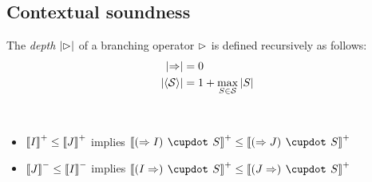 \subsection{Contextual soundness}

\begin{definition}
  The \emph{depth} $\left|\mathbin{\rhd}\right|$ of a branching operator $\mathbin{\rhd}$ is defined
  recursively as follows:
  \begin{align*}
    \left|\Rightarrow\right| &= 0 \\
    \left|\mathbin{\langle \mathcal{S} \rangle}\right| &= 1 + \max_{S \in \mathcal{S}}{\left|S\right|}
  \end{align*}
\end{definition}

\begin{lemma}[Functoriality]
  ~\\
  \begin{itemize}
    \item $\left\llbracket I \right\rrbracket^+ \leq \left\llbracket J \right\rrbracket^+$ implies $\psint{(\seq I) \mix S} \sement
    \psint{(\seq J) \mix S}$
    \item $\left\llbracket J \right\rrbracket^- \leq \left\llbracket I \right\rrbracket^-$ implies $\psint{(I \seq) \mix S} \sement
    \psint{(J \seq) \mix S}$
  \end{itemize}
\end{lemma}
